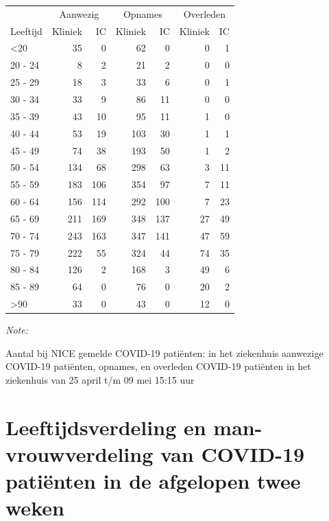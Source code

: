 \documentclass[
  english,
  man,floatsintext]{apa6}
\begin{document}
\begin{table}
\centering\begingroup\fontsize{10}{12}\selectfont

\begin{threeparttable}
\begin{tabular}{lrrrrrr}
\toprule
\multicolumn{1}{c}{ } & \multicolumn{2}{c}{Aanwezig} & \multicolumn{2}{c}{Opnames} & \multicolumn{2}{c}{Overleden} \\
\cmidrule(l{3pt}r{3pt}){2-3} \cmidrule(l{3pt}r{3pt}){4-5} \cmidrule(l{3pt}r{3pt}){6-7}
Leeftijd & Kliniek & IC & Kliniek & IC & Kliniek & IC\\
\midrule
<20 & 35 & 0 & 62 & 0 & 0 & 1\\
20 - 24 & 8 & 2 & 21 & 2 & 0 & 0\\
25 - 29 & 18 & 3 & 33 & 6 & 0 & 1\\
30 - 34 & 33 & 9 & 86 & 11 & 0 & 0\\
35 - 39 & 43 & 10 & 95 & 11 & 1 & 0\\
40 - 44 & 53 & 19 & 103 & 30 & 1 & 1\\
45 - 49 & 74 & 38 & 193 & 50 & 1 & 2\\
50 - 54 & 134 & 68 & 298 & 63 & 3 & 11\\
55 - 59 & 183 & 106 & 354 & 97 & 7 & 11\\
60 - 64 & 156 & 114 & 292 & 100 & 7 & 23\\
65 - 69 & 211 & 169 & 348 & 137 & 27 & 49\\
70 - 74 & 243 & 163 & 347 & 141 & 47 & 59\\
75 - 79 & 222 & 55 & 324 & 44 & 74 & 35\\
80 - 84 & 126 & 2 & 168 & 3 & 49 & 6\\
85 - 89 & 64 & 0 & 76 & 0 & 20 & 2\\
>90 & 33 & 0 & 43 & 0 & 12 & 0\\
\bottomrule
\end{tabular}
\begin{tablenotes}
\item \textit{Note: } 
\item Aantal bij NICE gemelde COVID-19 patiënten: in het ziekenhuis aanwezige COVID-19 patiënten, opnames, en overleden COVID-19 patiënten in het ziekenhuis van 25 april t/m 09 mei 15:15 uur
\end{tablenotes}
\end{threeparttable}
\endgroup{}
\end{table}

\newpage

\hypertarget{leeftijdsverdeling-en-man-vrouwverdeling-van-covid-19-patiuxebnten-in-de-afgelopen-twee-weken}{%
\section{Leeftijdsverdeling en man-vrouwverdeling van COVID-19 patiënten in de afgelopen twee weken}\label{leeftijdsverdeling-en-man-vrouwverdeling-van-covid-19-patiuxebnten-in-de-afgelopen-twee-weken}}
\end{document}
